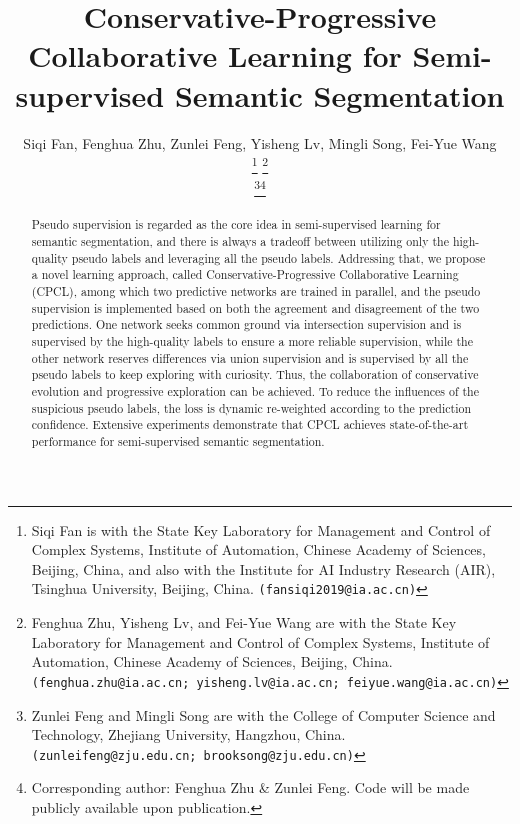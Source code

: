 \documentclass[journal]{IEEEtran}
\begin{document}
\title{Conservative-Progressive Collaborative Learning for Semi-supervised Semantic Segmentation}

\author{Siqi Fan, Fenghua Zhu, Zunlei Feng, Yisheng Lv, Mingli Song, Fei-Yue Wang

\thanks{Siqi Fan is with the State Key Laboratory for Management and Control of Complex Systems, Institute of Automation, Chinese Academy of Sciences, Beijing, China, and also with the Institute for AI Industry Research (AIR), Tsinghua 
University, Beijing, China.
        {\tt\small (fansiqi2019@ia.ac.cn)}}
\thanks{Fenghua Zhu, Yisheng Lv, and Fei-Yue Wang are with the State Key Laboratory for Management and Control of Complex Systems, 
Institute of Automation, Chinese Academy of Sciences, Beijing, China.
        {\tt\small (fenghua.zhu@ia.ac.cn; yisheng.lv@ia.ac.cn; feiyue.wang@ia.ac.cn)}}

\thanks{Zunlei Feng and Mingli Song are with the College of Computer Science and Technology, Zhejiang University, Hangzhou, China.
{\tt\small (zunleifeng@zju.edu.cn; brooksong@zju.edu.cn)}}\thanks{Corresponding author: 
Fenghua Zhu \& Zunlei Feng. Code will be made publicly available upon publication.}

}






\maketitle

\begin{abstract}

  Pseudo supervision is regarded as the core idea in semi-supervised learning for semantic segmentation, and there is always a tradeoff between utilizing 
  only the high-quality pseudo labels and leveraging all the pseudo labels. Addressing that, we propose a novel learning approach, called 
  Conservative-Progressive Collaborative Learning (CPCL), among which two predictive networks are trained in parallel, and the pseudo supervision is 
  implemented based on both the agreement and disagreement of the two predictions. One network seeks common ground via intersection supervision and is 
  supervised by the high-quality labels to ensure a more reliable supervision, while the other network reserves differences via union supervision and is 
  supervised by all the pseudo labels to keep exploring with curiosity. Thus, the collaboration of conservative evolution and progressive exploration can 
  be achieved. To reduce the influences of the suspicious pseudo labels, the loss is dynamic re-weighted according to the prediction confidence. Extensive 
  experiments demonstrate that CPCL achieves state-of-the-art performance for semi-supervised semantic segmentation.

\end{abstract}
\end{document}
